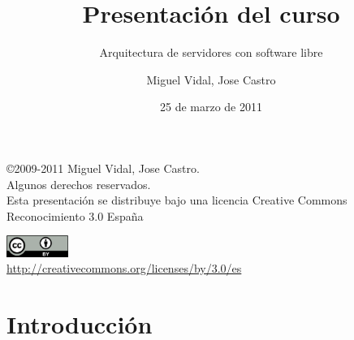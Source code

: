 \documentclass{beamer}
\begin{document}
\title{Presentación del curso}
\subtitle{Arquitectura de servidores con software libre}
\author{Miguel Vidal, Jose Castro}
\date{25 de marzo de 2011}


\begin{frame}
  \vspace{2cm}
  \begin{flushright}
    {\footnotesize \copyright{2009-2011} Miguel Vidal, Jose Castro.} \\
    \vspace{0.25cm}
    {\scriptsize Algunos derechos reservados. \\
    Esta presentación se distribuye bajo una licencia Creative Commons Reconocimiento 3.0 España}\\
    \vspace{0.10cm}
  \end{flushright}
  \begin{center}
    \href{http://creativecommons.org/licenses/by/3.0/es}{\includegraphics[width=2cm]{format/cc-by.png}} \\
    {\tiny \url{http://creativecommons.org/licenses/by/3.0/es}}
  \end{center}
\end{frame}


\section{Introducción}
\end{document}
